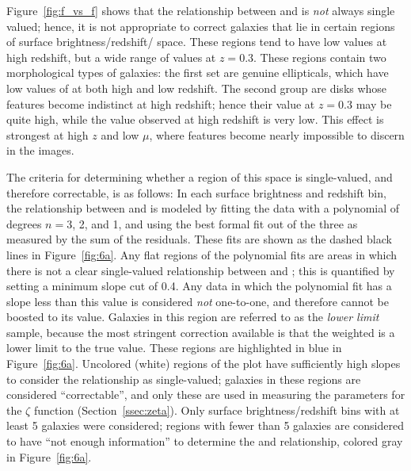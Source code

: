 \documentclass[twocolumn]{aastex6}
\begin{document}
Figure~\ref{fig:f_vs_f} shows that the relationship between \ffeaturesz{} and
\ffeaturesrest{} is \emph{not} always single valued; hence, it is not
appropriate to correct galaxies that lie in certain regions of surface
brightness/redshift/\ffeatures{} space. These regions tend to have low
\ffeatures{} values at high redshift, but a wide range of values at $z=0.3$.
These regions contain two morphological types of galaxies: the first set are
genuine ellipticals, which have low values of \ffeatures{} at both high and low
redshift. The second group are disks whose features become indistinct at high
redshift; hence their \ffeatures{} value at $z=0.3$ may be quite high, while
the value observed at high redshift is very low. This effect is strongest at
high $z$ and low $\mu$, where features become nearly impossible to discern in
the images.

The criteria for determining whether a region of this space is single-valued,
and therefore correctable, is as follows: In each surface brightness and
redshift bin, the relationship between \ffeaturesz{} and \ffeaturesrest{} is
modeled by fitting the data with a polynomial of degrees $n=3$, 2, and 1, and
using the best formal fit out of the three as measured by the sum of the
residuals. These fits are shown as the dashed black lines in
Figure~\ref{fig:6a}. Any flat regions of the polynomial fits are areas in which
there is not a clear single-valued relationship between \ffeaturesz{} and
\ffeaturesrest; this is quantified by setting a minimum slope cut of 0.4. Any
data in which the polynomial fit has a slope less than this value is considered
\emph{not} one-to-one, and therefore \ffeaturesz{} cannot be boosted to its
\ffeaturesrest{} value.  Galaxies in this region are referred to as the
\emph{lower limit} sample, because the most stringent correction available is
that the weighted \ffeatures{} is a lower limit to the true value.  These
regions are highlighted in blue in Figure~\ref{fig:6a}. Uncolored (white)
regions of the plot have sufficiently high slopes to consider the relationship
as single-valued; galaxies in these regions are considered ``correctable'', and
only these are used in measuring the parameters for the $\zeta$ function
(Section~\ref{ssec:zeta}). Only surface brightness/redshift bins with at least
5 galaxies were considered; regions with fewer than 5 galaxies are considered
to have ``not enough information'' to determine the \ffeaturesz{} and
\ffeaturesrest{} relationship, colored gray in Figure~\ref{fig:6a}.
\end{document}

